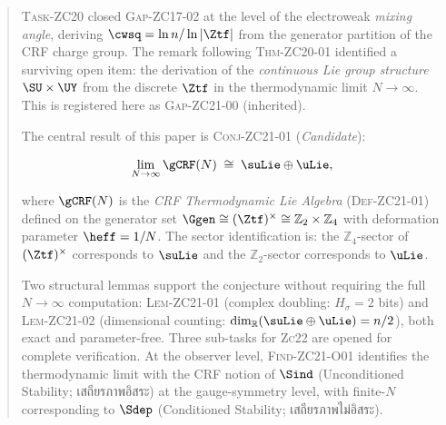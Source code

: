 \documentclass[12pt, a4paper]{article}
\begin{document}

\thispagestyle{empty}

\begin{abstract}
\noindent
\textsc{Task-ZC20} closed \textsc{Gap-ZC17-02} at the level of the electroweak
\emph{mixing angle}, deriving $\cwsq = \ln n / \ln |\Ztf|$ from the
generator partition of the CRF charge group.
The remark following \textsc{Thm-ZC20-01} identified a surviving open item:
the derivation of the \emph{continuous Lie group structure}
$\SU \times \UY$ from the discrete $\Ztf$
in the thermodynamic limit $N\to\infty$.
This is registered here as \textsc{Gap-ZC21-00} (inherited).

The central result of this paper is
\textsc{Conj-ZC21-01} (\emph{Candidate}):

\begin{equation*}
  \lim_{N\to\infty} \gCRF(N) \;\cong\; \suLie \oplus \uLie,
\end{equation*}

where $\gCRF(N)$ is the \emph{CRF Thermodynamic Lie Algebra}
(\textsc{Def-ZC21-01}) defined on the generator set
$\Ggen \cong (\Ztf)^\times \cong \mathbb{Z}_2 \times \mathbb{Z}_4$
with deformation parameter $\heff = 1/N$.
The sector identification is:
the $\mathbb{Z}_4$-sector of $(\Ztf)^\times$ corresponds to $\suLie$
and the $\mathbb{Z}_2$-sector corresponds to $\uLie$.

Two structural lemmas support the conjecture without requiring the full
$N\to\infty$ computation:
\textsc{Lem-ZC21-01} (complex doubling: $H_\sigma = 2$ bits)
and \textsc{Lem-ZC21-02} (dimensional counting: $\dim_\mathbb{R}(\suLie\oplus\uLie) = n/2$),
both exact and parameter-free.
Three sub-tasks for \textsc{Zc22} are opened for complete verification.
At the observer level, \textsc{Find-ZC21-O01} identifies the thermodynamic
limit with the CRF notion of $\Sind$ (Unconditioned Stability; เสถียรภาพอิสระ)
at the gauge-symmetry level, with finite-$N$ corresponding to
$\Sdep$ (Conditioned Stability; เสถียรภาพไม่อิสระ).
\end{abstract}
\end{document}
